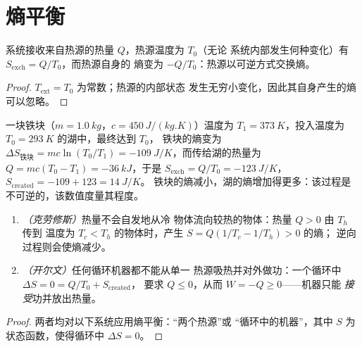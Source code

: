 \section{熵平衡}

\begin{proposition}[与热源交换的热量]\label{prop:b1:second-law-entropy:thermostat}
系统接收来自热源的热量 $Q$，热源温度为 $T_0$（无论
系统内部发生何种变化）有 $S_{\mathrm{exch}} = Q/T_0$，而热源自身的
熵变为 $-Q/T_0$：热源以可逆方式交换熵。
\end{proposition}

\begin{proof}
$T_{\mathrm{ext}} = T_0$ 为常数；热源的内部状态
发生无穷小变化，因此其自身产生的熵可以忽略。
\end{proof}

\begin{example}[冷湖中的热物体]\label{ex:b1:second-law-entropy:quench}
一块铁块（$m = \qty{1.0}{kg}$，$c = \qty{450}{J/(kg.K)}$）温度为 $T_1 =
\qty{373}{K}$，投入温度为 $T_0 = \qty{293}{K}$ 的湖中，最终达到 $T_0$，
铁块的熵变为 $\Delta S_{\text{铁块}} = mc\ln(T_0/T_1) = \qty{-109}{J/K}$，而传给湖的热量为 $Q =
mc(T_0 - T_1) = \qty{-36}{kJ}$，于是 $S_{\mathrm{exch}} =
Q/T_0 = \qty{-123}{J/K}$，$S_{\mathrm{created}} = -109 + 123 = \qty{+14}{J/K}$。
铁块的熵减小，湖的熵增加得更多：该过程是
不可逆的，该数值度量其程度。
\end{example}

\begin{proposition}[两个推论]\label{prop:b1:second-law-entropy:clausiuskelvin}
\begin{enumerate}
  \item \emph{（克劳修斯）}热量不会自发地从冷
        物体流向较热的物体：热量 $Q > 0$ 由 $T_h$ 传到
        温度为 $T_c < T_h$ 的物体时，产生 $S = Q(1/T_c - 1/T_h) > 0$ 的熵；
        逆向过程则会使熵减少。
  \item \emph{（开尔文）}任何循环机器都不能从单一
        热源吸热并对外做功：一个循环中 $\Delta S = 0 = Q/T_0 + S_{\mathrm{created}}$，
        要求 $Q \leq 0$，从而 $W = -Q \geq 0$——机器只能
        \emph{接受}功并放出热量。
\end{enumerate}
\end{proposition}

\begin{proof}
两者均对以下系统应用熵平衡：“两个热源”或
“循环中的机器”，其中 $S$ 为状态函数，使得循环中 $\Delta S
= 0$。
\end{proof}

